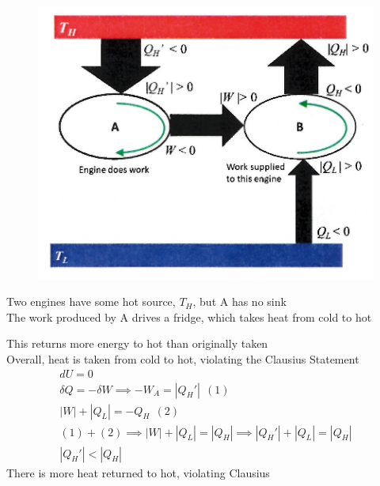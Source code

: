\documentclass[a4paper, 11pt, normalem]{report}
\begin{document}
\begin{figure}
    \begin{center}
        \vspace{-10pt}
        \includegraphics[scale=0.4]{KelvinClause.png}
        \vspace{-70pt}
    \end{center}
\end{figure}

Two engines have some hot source, $T_H$, but A has no sink \\
The work produced by A drives a fridge, which takes heat from cold to hot

This returns more energy to hot than originally taken \\
Overall, heat is taken from cold to hot, violating the Clausius Statement
\begin{gather*}
    dU = 0 \\
    \delta Q = - \delta W \implies -W_A = |Q_{H}'| ~~ (1) \\
    |W| + |Q_{L}| = -Q_{H} ~~ (2) \\
    (1) + (2) \implies |W| + |Q_{L}| = |Q_{H}| \implies |Q_{H}'| + |Q_{L}| = |Q_{H}| \\
    |Q_{H}'| < |Q_{H}|
\end{gather*}
There is more heat returned to hot, violating Clausius
\end{document}
